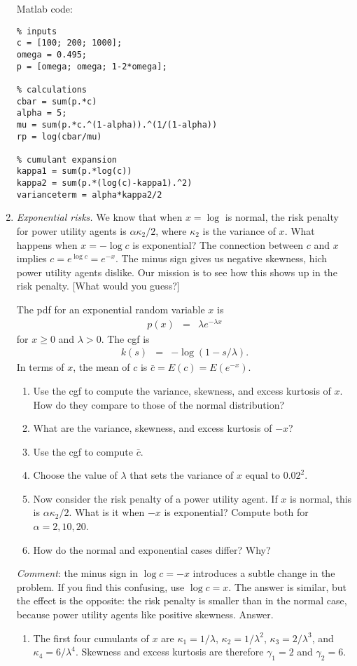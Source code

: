 \documentclass[11pt]{article}
\begin{document}
\begin{enumerate}
Matlab code:
\begin{verbatim}
% inputs
c = [100; 200; 1000];
omega = 0.495;
p = [omega; omega; 1-2*omega];

% calculations
cbar = sum(p.*c)
alpha = 5;
mu = sum(p.*c.^(1-alpha)).^(1/(1-alpha))
rp = log(cbar/mu)

% cumulant expansion
kappa1 = sum(p.*log(c))
kappa2 = sum(p.*(log(c)-kappa1).^2)
varianceterm = alpha*kappa2/2
\end{verbatim}

\item {\it Exponential risks.\/}
We know that when $ x = \log $ is normal,
the risk penalty for power utility agents is
$ \alpha \kappa_2/2 $,
where $\kappa_2$ is the variance of $x$.
What happens when $x = - \log c $ is exponential?
The connection between $c$ and $x$ implies $c = e^{\log c} = e^{-x}$.
The minus sign gives us negative skewness,
hich power utility agents dislike.
Our mission is to see how this shows up in the risk penalty.
[What would you guess?]

The pdf for an exponential random variable $x$ is
\begin{eqnarray*}
    p(x)  &=& \lambda e^{-\lambda x}
\end{eqnarray*}
for $x \geq 0$ and $\lambda > 0$.
The cgf is
\begin{eqnarray*}
    k(s)  &=& - \log \left( 1 - s/\lambda \right) .
\end{eqnarray*}
In terms of $x$, the mean of $c$ is $\bar{c} = E(c) = E (e^{-x})$.

\begin{enumerate}
\item Use the cgf to compute the variance, skewness, and excess kurtosis
of $x$.  How do they compare to those of the normal distribution?
\item What are the variance, skewness, and excess kurtosis of $-x$?
\item Use the cgf to compute $\bar{c}$.
\item Choose the value of $\lambda$ that sets
the variance of $x$ equal to $0.02^2$.
\item Now consider the risk penalty of a power utility agent.
If $x$ is normal, this is $\alpha \kappa_2/2 $.
What is it when $-x$ is exponential?
Compute both for $\alpha = 2, 10, 20$.
\item How do the normal and exponential cases differ?  Why?
\end{enumerate}
{\it Comment\/}: the minus sign in $ \log c = -x $ introduces
a subtle change in the problem.
If you find this confusing, use $ \log c = x$.
The answer is similar, but the effect is the opposite:
the risk penalty is smaller than in the normal case, because
power utility agents like positive skewness.
%
Answer.
\begin{enumerate}
\item The first four cumulants of $x$ are
$\kappa_1 = 1/\lambda$,
$\kappa_2 = 1/\lambda^2$,
$\kappa_3 = 2/\lambda^3$,
and $\kappa_4 = 6/\lambda^4$.
Skewness and excess kurtosis are therefore
$\gamma_1 = 2$ and $\gamma_2 = 6$.


\end{enumerate}
\end{enumerate}
\end{document}

